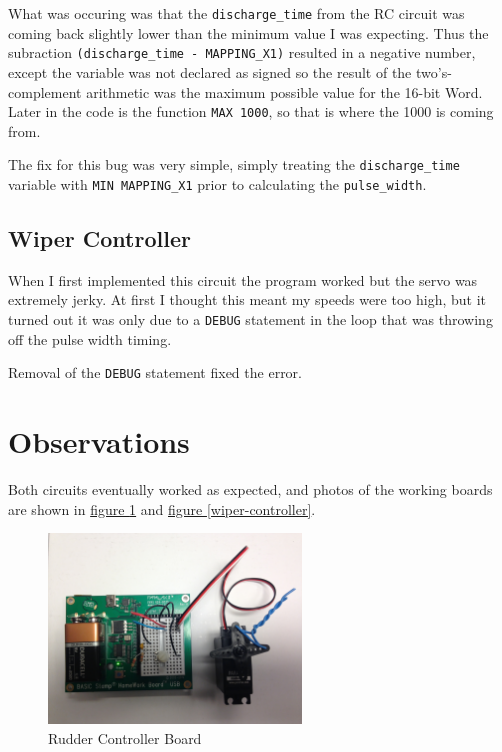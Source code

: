\documentclass[11pt]{article}
\begin{document}
What was occuring was that the \texttt{discharge\_time} from the RC circuit
was coming back slightly lower than the minimum value I was expecting.
Thus the subraction \mbox{\texttt{(discharge\_time - MAPPING\_X1)}} resulted
in a negative number, except the variable was not declared as signed so
the result of the two's-complement arithmetic was the maximum possible
value for the 16-bit Word. Later in the code is the function
\mbox{\texttt{MAX 1000}}, so that is where the 1000 is coming from.

The fix for this bug was very simple, simply treating the
\texttt{discharge\_time} variable with \mbox{\texttt{MIN MAPPING\_X1}}
prior to calculating the \texttt{pulse\_width}.

\subsection{Wiper Controller}

When I first implemented this circuit the program worked but the servo
was extremely jerky. At first I thought this meant my speeds were too
high, but it turned out it was only due to a \texttt{DEBUG} statement
in the loop that was throwing off the pulse width timing.

Removal of the \texttt{DEBUG} statement fixed the error.

\section{Observations}

Both circuits eventually worked as expected, and photos of the working boards are shown in
\hyperref[rudder-controller]{figure \ref{rudder-controller}}
and \hyperref[wiper-controller]{figure \ref{wiper-controller}}.

\begin{figure}
\centering
\includegraphics[width=0.6\textwidth]{rudder-controller.jpg}
\caption{Rudder Controller Board}
\label{rudder-controller}
\end{figure}
\end{document}
